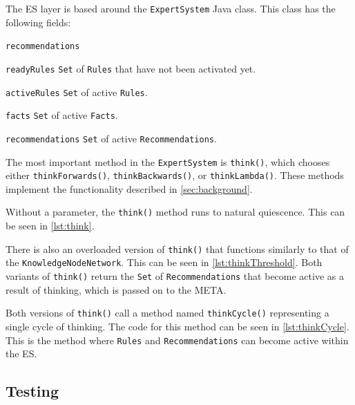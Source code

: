 \documentclass[titlepage,11pt]{article}
\def \espath {"C:/Users/Sean/IdeaProjects/Prometheus/src/es/ExpertSystem.java"}
\newcommand{\ar}[1]{\autoref{#1}}
\newcommand{\code}[1]{\texttt{#1}}
\begin{document}
The ES layer is based around the \code{ExpertSystem} Java class. This class has the following fields:

\begin{labeling}{\code{recommendations}}
	\item[\code{readyRules}] \code{Set} of \code{Rules} that have not been activated yet.
	\item[\code{activeRules}] \code{Set} of active \code{Rules}.
	\item[\code{facts}] \code{Set} of active \code{Facts}.
	\item[\code{recommendations}] \code{Set} of active \code{Recommendations}.
\end{labeling}

The most important method in the \code{ExpertSystem} is \code{think()}, which chooses either \code{thinkForwards()}, \code{thinkBackwards()}, or \code{thinkLambda()}. These methods implement the functionality described in \ar{sec:background}.

Without a parameter, the \code{think()} method runs to natural quiescence. This can be seen in \autoref{lst:think}.



There is also an overloaded version of \code{think()} that functions similarly to that of the \code{KnowledgeNodeNetwork}. This can be seen in \autoref{lst:thinkThreshold}. Both variants of \code{think()} return the \code{Set} of \code{Recommendations} that become active as a result of thinking, which is passed on to the META.



Both versions of \code{think()} call a method named \code{thinkCycle()} representing a single cycle of thinking. The code for this method can be seen in \autoref{lst:thinkCycle}. This is the method where \code{Rules} and \code{Recommendations} can become active within the ES.



\subsection{Testing}
\end{document}
